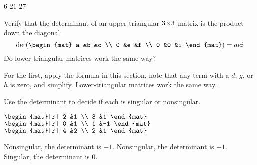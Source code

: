 \begin{exercises}
    \begin{answer}
      \begin{exparts*}
        \partsitem \( 6 \)
        \partsitem \( 21 \)
        \partsitem \( 27 \)
      \end{exparts*}  
    \end{answer}
  \recommended \item  
    Verify that the determinant of an upper-triangular
    $3 \! \times \! 3$ matrix is the product down the diagonal. 
    \begin{equation*}
       \det(
       \begin{mat}
           a    &b   &c    \\
           0    &e   &f    \\
           0    &0   &i
       \end{mat}
       )
       =aei
    \end{equation*}
    Do lower-triangular matrices work the same way?
    \begin{answer}
      For the first, apply the formula in this section, note that any
      term with a \( d \), \( g \), or \( h \) is zero, and simplify.
      Lower-triangular matrices work the same way.  
    \end{answer}
  \recommended \item 
     Use the determinant to decide if each is singular or
     nonsingular.
     \begin{exparts*}
       \partsitem \(
            \begin{mat}[r]
                2    &1   \\
                3    &1
            \end{mat}    \)
       \partsitem \(
            \begin{mat}[r]
                0    &1   \\
                1    &-1
            \end{mat}    \)
       \partsitem \(
            \begin{mat}[r]
                4    &2   \\
                2    &1
            \end{mat}    \)
     \end{exparts*}
     \begin{answer}
       \begin{exparts}
         \partsitem Nonsingular, the determinant is \( -1 \).
         \partsitem Nonsingular, the determinant is \( -1 \).
         \partsitem Singular, the determinant is \( 0 \).

\end{exparts}
\end{answer}
\end{exercises}
